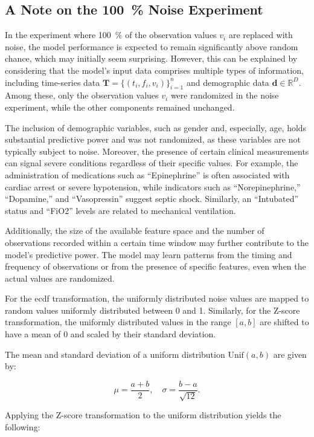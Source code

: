 \subsection{A Note on the \qty{100}{\percent} Noise Experiment}
\label{sec:100_noise}

In the experiment where \qty{100}{\percent} of the observation values \(v_i\) are replaced with noise, the model performance is expected to remain significantly above random chance, which may initially seem surprising. However, this can be explained by considering that the model's input data comprises multiple types of information, including time-series data \(\mathbf{T} = \{(t_i, f_i, v_i)\}_{i=1}^n\) and demographic data \(\mathbf{d} \in \mathbb{R}^D\). Among these, only the observation values \(v_i\) were randomized in the noise experiment, while the other components remained unchanged.

The inclusion of demographic variables, such as gender and, especially, age, holds substantial predictive power and was not randomized, as these variables are not typically subject to noise. Moreover, the presence of certain clinical measurements can signal severe conditions regardless of their specific values. For example, the administration of medications such as ``Epinephrine'' is often associated with cardiac arrest or severe hypotension, while indicators such as ``Norepinephrine,'' ``Dopamine,'' and ``Vasopressin'' suggest septic shock. Similarly, an ``Intubated'' status and ``FiO2'' levels are related to mechanical ventilation.

Additionally, the size of the available feature space and the number of observations recorded within a certain time window may further contribute to the model's predictive power. The model may learn patterns from the timing and frequency of observations or from the presence of specific features, even when the actual values are randomized.


For the \gls{ecdf} transformation, the uniformly distributed noise values are mapped to random values uniformly distributed between 0 and 1. Similarly, for the Z-score transformation, the uniformly distributed values in the range \( [a, b] \) are shifted to have a mean of 0 and scaled by their standard deviation.

The mean and standard deviation of a uniform distribution \( \text{Unif}(a, b) \) are given by:

\[
    \mu = \frac{a + b}{2}, \quad \sigma = \frac{b - a}{\sqrt{12}}.
\]

Applying the Z-score transformation to the uniform distribution yields the following:

